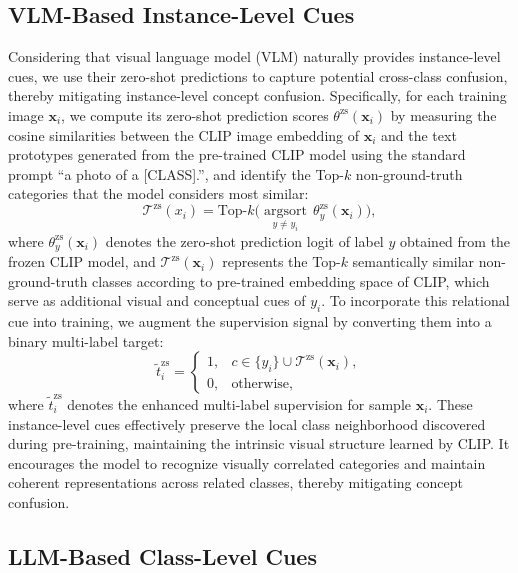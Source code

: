 \subsection{VLM-Based Instance-Level Cues}
\label{sec:vlm_prior}
Considering that visual language model (VLM) naturally provides instance-level cues, we use their zero-shot predictions to capture potential cross-class confusion, thereby mitigating instance-level concept confusion. Specifically, for each training image $\mathbf{x}_i$, we compute its zero-shot prediction scores ${\theta}^{\text{zs}}(\mathbf{x}_i)$ by measuring the cosine similarities between the CLIP image embedding of $\mathbf{x}_i$ and the text prototypes generated from the pre-trained CLIP model using the standard prompt ``a photo of a [CLASS].'', and identify the Top-$k$ non-ground-truth categories that the model considers most similar:
\begin{equation}
\mathcal{T}^{\text{zs}}(x_i) = \text{Top-}k\Big(\operatorname*{argsort}_{y \neq y_i}\, {\theta}^{\text{zs}}_y(\mathbf{x}_i)\Big),
\end{equation}
where ${\theta}^{\text{zs}}_y(\mathbf{x}_i)$ denotes the zero-shot prediction logit of label $y$ obtained from the frozen CLIP model, and $\mathcal{T}^{\text{zs}}(\mathbf{x}_i)$ represents the Top-$k$ semantically similar non-ground-truth classes according to pre-trained embedding space of CLIP, which serve as additional visual and conceptual cues of $y_i$. 
To incorporate this relational cue into training, we augment the supervision signal by converting them into a binary multi-label target:
\begin{equation}
\tilde{t}^{\text{zs}}_{i} =
\begin{cases}
1, & c \in \{y_i\} \cup \mathcal{T}^{\text{zs}}(\mathbf{x}_i), \\
0, & \text{otherwise,}
\end{cases}
\end{equation}
where $\tilde{t}^{\text{zs}}_{i}$ denotes the enhanced multi-label supervision for sample $\mathbf{x}_i$.
These instance-level cues effectively preserve the local class neighborhood discovered during pre-training, maintaining the intrinsic visual structure learned by CLIP. It encourages the model to recognize visually correlated categories and maintain coherent representations across related classes, thereby mitigating concept confusion.

\subsection{LLM-Based Class-Level Cues}
\label{sec:llm_prior}

